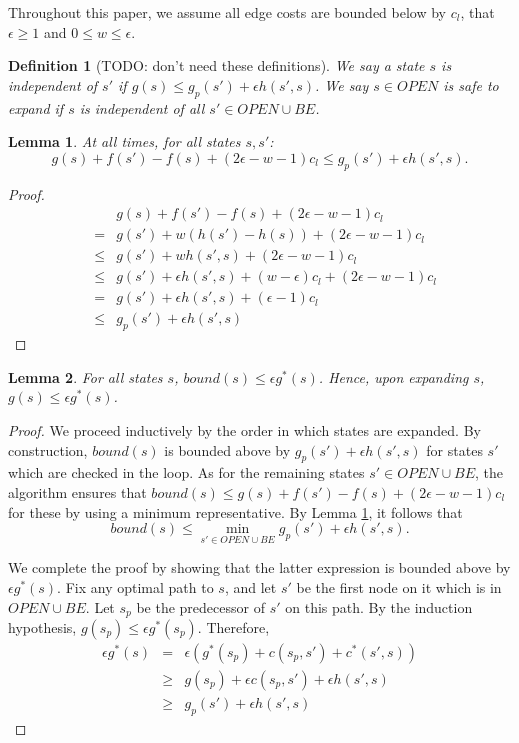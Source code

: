 \documentclass[letterpaper]{article}
\newtheorem{defn}{Definition}
\newtheorem{lemma}{Lemma}
\begin{document}
Throughout this paper, we assume all edge costs are bounded below by $c_l$, that $\epsilon \ge 1$ and $0 \le w \le \epsilon$.

\begin{defn}[TODO: don't need these definitions]
We say a state $s$ is independent of $s'$ if $g(s) \le g_p(s') + \epsilon h(s',s)$. We say $s\in OPEN$ is safe to expand if $s$ is independent of all $s'\in OPEN \cup BE$.
\end{defn}

\begin{lemma}
\label{lem:indep}
At all times, for all states $s,s'$:
\[g(s) + f(s') - f(s) + (2\epsilon-w-1) c_l \le g_p(s') + \epsilon h(s',s).\]
\end{lemma}

\begin{proof}
\begin{eqnarray*}
&&g(s) + f(s') - f(s) + (2\epsilon-w-1) c_l
\\&=& g(s') + w(h(s') - h(s)) + (2\epsilon-w-1) c_l
\\&\le& g(s') + wh(s',s) + (2\epsilon-w-1) c_l
\\&\le& g(s') + \epsilon h(s',s) + (w-\epsilon) c_l + (2\epsilon-w-1) c_l
\\&=& g(s') + \epsilon h(s',s) + (\epsilon-1) c_l
\\&\le& g_p(s') + \epsilon h(s',s)
\end{eqnarray*}
\end{proof}

\begin{lemma}
\label{lem:subopt}
For all states $s$, $bound(s) \le \epsilon g^*(s)$. Hence, upon expanding $s$, $g(s) \le \epsilon g^*(s)$.
\end{lemma}

\begin{proof}
We proceed inductively by the order in which states are expanded. By construction, $bound(s)$ is bounded above by $g_p(s') + \epsilon h(s',s)$ for states $s'$ which are checked in the loop. As for the remaining states $s' \in OPEN \cup BE$, the algorithm ensures that $bound(s) \le g(s) + f(s') - f(s) + (2\epsilon-w-1) c_l$ for these by using a minimum representative. By Lemma \ref{lem:indep}, it follows that
\[bound(s) \le \min_{s' \in OPEN \cup BE} g_p(s') + \epsilon h(s',s).\]

We complete the proof by showing that the latter expression is bounded above by $\epsilon g^*(s)$. Fix any optimal path to $s$, and let $s'$ be the first node on it which is in $OPEN \cup BE$. Let $s_p$ be the predecessor of $s'$ on this path. By the induction hypothesis, $g(s_p) \le \epsilon g^*(s_p)$. Therefore,
\begin{eqnarray*}
\epsilon g^*(s)&=& \epsilon\left(g^*(s_p) + c(s_p,s') + c^*(s',s)\right)
\\&\ge& g(s_p) + \epsilon c(s_p,s') + \epsilon h(s',s)
\\&\ge& g_p(s') + \epsilon h(s',s)
\end{eqnarray*}
\end{proof}
\end{document}
